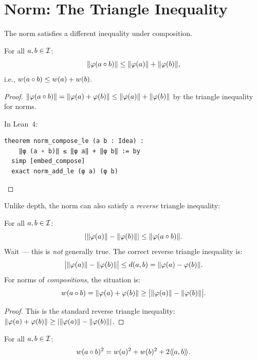 \section{Norm: The Triangle Inequality}

The norm satisfies a different inequality under composition.

\begin{theorem}
\label{thm:norm-triangle}
For all $a, b \in \mathcal{I}$:
\[
  \lVert \varphi(a \circ b) \rVert \leq \lVert \varphi(a) \rVert + \lVert \varphi(b) \rVert,
\]
i.e., $w(a \circ b) \leq w(a) + w(b)$.
\end{theorem}

\begin{proof}
$\lVert \varphi(a \circ b) \rVert = \lVert \varphi(a) + \varphi(b) \rVert \leq
\lVert \varphi(a) \rVert + \lVert \varphi(b) \rVert$ by the triangle inequality for norms.

In Lean~4:
\begin{lstlisting}
theorem norm_compose_le (a b : Idea) :
    ‖φ (a ∘ b)‖ ≤ ‖φ a‖ + ‖φ b‖ := by
  simp [embed_compose]
  exact norm_add_le (φ a) (φ b)
\end{lstlisting}
\end{proof}

Unlike depth, the norm can also satisfy a \emph{reverse} triangle inequality:

\begin{theorem}
\label{thm:reverse-triangle}
For all $a, b \in \mathcal{I}$:
\[
  |\lVert \varphi(a) \rVert - \lVert \varphi(b) \rVert| \leq \lVert \varphi(a \circ b) \rVert.
\]
Wait --- this is \emph{not} generally true. The correct reverse triangle
inequality is:
\[
  \big|\lVert \varphi(a) \rVert - \lVert \varphi(b) \rVert\big| \leq d(a, b) =
  \lVert \varphi(a) - \varphi(b) \rVert.
\]
For norms of \emph{compositions}, the situation is:
\[
  w(a \circ b) = \lVert \varphi(a) + \varphi(b) \rVert \geq
  \big|\lVert \varphi(a) \rVert - \lVert \varphi(b) \rVert\big|.
\]
\end{theorem}

\begin{proof}
This is the standard reverse triangle inequality: $\lVert \varphi(a) + \varphi(b) \rVert
\geq |\lVert \varphi(a) \rVert - \lVert \varphi(b) \rVert|$.
\end{proof}

\begin{theorem}
\label{thm:norm-expansion}
For all $a, b \in \mathcal{I}$:
\[
  w(a \circ b)^2 = w(a)^2 + w(b)^2 + 2\langle\!\langle a, b \rangle\!\rangle.
\]
\end{theorem}

